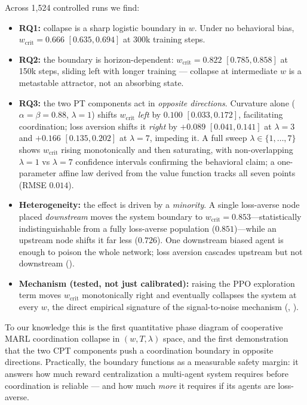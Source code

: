 \documentclass[11pt]{article}
\newcommand{\wcrit}{w_{\mathrm{crit}}}
\begin{document}
Across 1,524 controlled runs we find:
\begin{itemize}
  \item \textbf{RQ1:} collapse is a sharp logistic boundary in $w$.
        Under no behavioral bias, $\wcrit = 0.666$ $[0.635, 0.694]$ at
        300k training steps.
  \item \textbf{RQ2:} the boundary is horizon-dependent:
        $\wcrit = 0.822$ $[0.785, 0.858]$ at 150k steps, sliding left
        with longer training --- collapse at intermediate $w$ is a
        metastable attractor, not an absorbing state.
  \item \textbf{RQ3:} the two PT components act in \emph{opposite
        directions}. Curvature alone ($\alpha{=}\beta{=}0.88$,
        $\lambda{=}1$) shifts $\wcrit$ \emph{left} by $0.100$
        $[0.033, 0.172]$, facilitating coordination; loss aversion
        shifts it \emph{right} by $+0.089$ $[0.041, 0.141]$ at
        $\lambda{=}3$ and $+0.166$ $[0.135, 0.202]$ at $\lambda{=}7$,
        impeding it. A full sweep $\lambda \in \{1,\ldots,7\}$ shows
        $\wcrit$ rising monotonically and then saturating, with
        non-overlapping $\lambda{=}1$ vs $\lambda{=}7$ confidence intervals
        confirming the behavioral claim; a one-parameter affine law
        derived from the value function tracks all seven points
        (RMSE $0.014$).
  \item \textbf{Heterogeneity:} the effect is driven by a
        \emph{minority}. A single loss-averse node placed \emph{downstream}
        moves the system boundary to $\wcrit = 0.853$---statistically
        indistinguishable from a fully loss-averse population
        ($0.851$)---while an upstream node shifts it far less ($0.726$).
        One downstream biased agent is enough to poison the whole network;
        loss aversion cascades upstream but not downstream
        ().
  \item \textbf{Mechanism (tested, not just calibrated):} raising the PPO
        exploration term moves $\wcrit$ monotonically right and eventually
        collapses the system at every $w$, the direct empirical signature of
        the signal-to-noise mechanism (,
        ).
\end{itemize}
To our knowledge this is the first quantitative phase diagram of
cooperative MARL coordination collapse in $(w, T, \lambda)$ space, and
the first demonstration that the two CPT components push a coordination
boundary in opposite directions.
Practically, the boundary functions as a measurable safety margin: it
answers how much reward centralization a multi-agent system requires
before coordination is reliable --- and how much \emph{more} it requires
if its agents are loss-averse.
\end{document}
